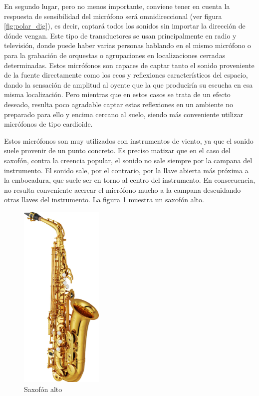 En segundo lugar, pero no menos importante, conviene tener en cuenta la respuesta de sensibilidad del micrófono será omnidireccional (ver figura \ref{fig:polar_dig}), es decir, captará todos los sonidos sin importar la dirección de dónde vengan. Este tipo de transductores se usan principalmente en radio y televisión, donde puede haber varias personas hablando en el mismo micrófono o para la grabación de orquestas o agrupaciones en localizaciones cerradas determinadas. Estos micrófonos son capaces de captar tanto el sonido proveniente de la fuente directamente como los ecos y reflexiones característicos del espacio, dando la sensación de amplitud al oyente que la que produciría su escucha en esa misma localización. Pero mientras que en estos casos se trata de un efecto deseado, resulta poco agradable captar estas reflexiones en un ambiente no preparado para ello y encima cercano al suelo, siendo más conveniente utilizar micrófonos de tipo cardioide.

Estos micrófonos son muy utilizados con instrumentos de viento, ya que el sonido suele provenir de un punto concreto. Es preciso matizar que en el caso del saxofón, contra la creencia popular, el sonido no sale siempre por la campana del instrumento. El sonido sale, por el contrario, por la llave abierta más próxima a la embocadura, que suele ser en torno al centro del instrumento. En consecuencia, no resulta conveniente acercar el micrófono mucho a la campana descuidando otras llaves del instrumento. La figura \ref{fig:saxo} muestra un saxofón alto.

\begin{figure}[!b]
\begin{center}
\includegraphics[height=9cm]{img/saxo.png}
\caption{\label{fig:saxo}Saxofón alto}
\end{center}
\end{figure}

